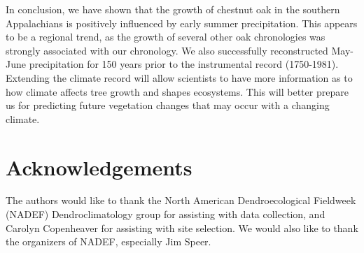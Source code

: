 In conclusion, we have shown that the growth of chestnut oak in
the southern Appalachians is positively influenced by early summer
precipitation. This appears to be a regional trend, as the growth
of several other oak chronologies was strongly associated with our
chronology. We also successfully reconstructed May-June precipitation
for 150 years prior to the instrumental record (1750-1981). Extending
the climate record will allow scientists to have more information as to
how climate affects tree growth and shapes ecosystems. This will better
prepare us for predicting future vegetation changes that may occur with
a changing climate.

\section{Acknowledgements} The authors would like to thank the North American Dendroecological Fieldweek (NADEF) Dendroclimatology group for assisting with data collection, and Carolyn Copenheaver for assisting
with site selection. We would also like to thank the organizers of NADEF, especially Jim Speer.

